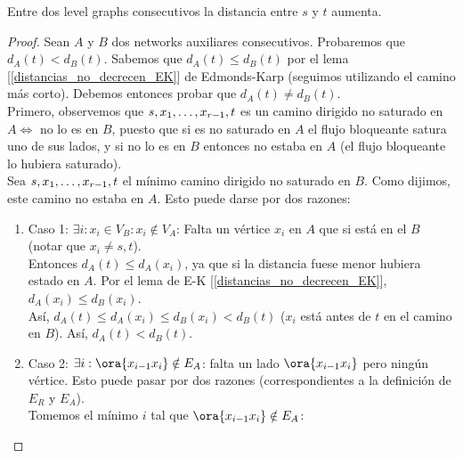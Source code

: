 \begin{theorem}
Entre dos level graphs consecutivos la distancia entre $s$ y $t$ aumenta.
\end{theorem}

\begin{proof}
Sean $A$ y $B$ dos networks auxiliares consecutivos. Probaremos que $d_A(t) < d_B(t)$. 
Sabemos que $d_A(t) \le d_B(t)$ por el lema [\ref{distancias_no_decrecen_EK}] de Edmonds-Karp (seguimos utilizando el camino más corto).
Debemos entonces probar que $d_A(t) \neq d_B(t)$.\\
Primero, observemos que $s, x_1, \mathellipsis, x_{r-1}, t$ es un camino dirigido no saturado en $A \iff$ no lo es en $B$, puesto que si es no saturado en $A$ el flujo bloqueante satura uno de sus lados, y si no lo es en $B$ entonces no estaba en $A$ (el flujo bloqueante lo hubiera saturado).\\
Sea $s, x_1, \mathellipsis, x_{r-1}, t$ el mínimo camino dirigido no saturado en $B$. Como dijimos, este camino no estaba en $A$. Esto puede darse por dos razones:

\begin{enumerate}
    \item Caso 1: $\exists i : x_i \in V_B : x_i \notin V_A$: Falta un vértice $x_i$ en $A$ que si está en el $B$ (notar que $x_i \neq s,t$).\\
    Entonces $d_A(t) \le d_A(x_i)$, ya que si la distancia fuese menor hubiera estado en $A$. Por el lema de E-K [\ref{distancias_no_decrecen_EK}], $d_A(x_i) \le d_B(x_i)$.\\
    Así, $d_{A}(t) \le d_{A}(x_i) \le d_{B}(x_i) < d_{B}(t)$ ($x_i$ está antes de $t$ en el camino en $B$). Así, $d_A(t) < d_B(t)$.
    
    \item Caso 2: $\exists i : \ora{x_{i-1} x_i} \notin E_A$: falta un lado $\ora{x_{i-1} x_{i}}$ pero ningún vértice. 
    Esto puede pasar por dos razones (correspondientes a la definición de $E_R$ y $E_A$). \\
    Tomemos el mínimo $i$ tal que $\ora{x_{i-1} x_{i}} \notin E_A$:
    

\end{enumerate}
\end{proof}
